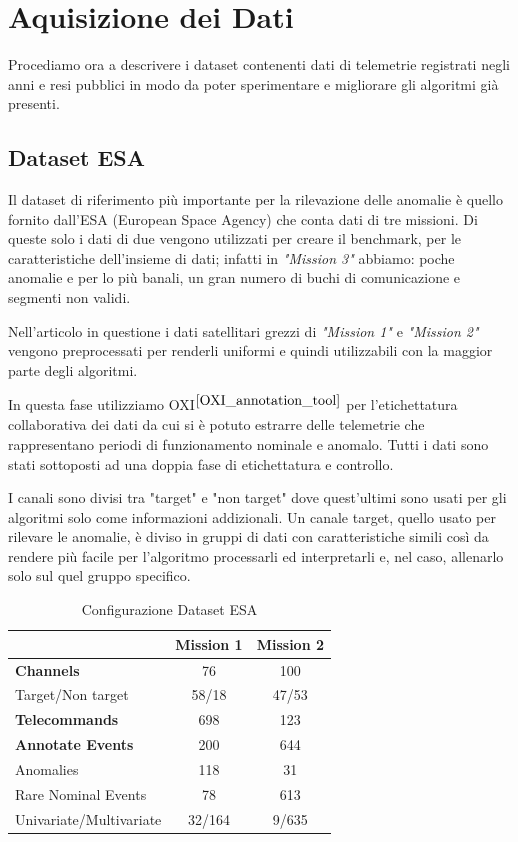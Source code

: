 \chapter{Aquisizione dei Dati}
Procediamo ora a descrivere i dataset contenenti dati di telemetrie registrati negli anni e resi pubblici in modo da poter sperimentare e migliorare gli algoritmi già presenti.

\section{Dataset ESA}

Il dataset di riferimento più importante per la rilevazione delle anomalie è quello fornito dall'ESA (European Space Agency) che conta dati di tre missioni. Di queste solo i dati di due vengono utilizzati per creare il benchmark, per le caratteristiche dell'insieme di dati; infatti in \textit{"Mission 3"} abbiamo: poche anomalie e per lo più banali, un gran numero di buchi di comunicazione e segmenti non validi.

Nell'articolo in questione i dati satellitari grezzi di \textit{"Mission 1"} e \textit{"Mission 2"} vengono preprocessati per renderli uniformi e quindi utilizzabili con la maggior parte degli algoritmi.

In questa fase utilizziamo OXI$^{\cite{OXI_annotation_tool}}$ per l'etichettatura collaborativa dei dati da cui si è potuto estrarre delle telemetrie che rappresentano periodi di funzionamento nominale e anomalo. Tutti i dati sono stati sottoposti ad una doppia fase di etichettatura e controllo.

I canali sono divisi tra "target" e "non target" dove quest'ultimi sono usati per gli algoritmi solo come informazioni addizionali. Un canale target, quello usato per rilevare le anomalie, è diviso in gruppi di dati con caratteristiche simili così da rendere più facile per l'algoritmo processarli ed interpretarli e, nel caso, allenarlo solo sul quel gruppo specifico.
\pagebreak

\begin{table}[h]
    \centering
    \begin{tabular}{|l|c|c|}
        \hline
         \textbf{}& \textbf{Mission 1} & \textbf{Mission 2}\\
         \hline
        \textbf{Channels} & 76 & 100\\
        Target/Non target & 58/18 & 47/53\\
        \hline
        \textbf{Telecommands} & 698 & 123\\
        \hline
        \textbf{Annotate Events} & 200 & 644 \\
        Anomalies& 118 & 31\\
        Rare Nominal Events &78  & 613\\
        Univariate/Multivariate& 32/164 & 9/635\\
        \hline
    \end{tabular}
    \caption{Configurazione Dataset ESA}
    \label{tab:costituzioneESA_dataset}
\end{table}

